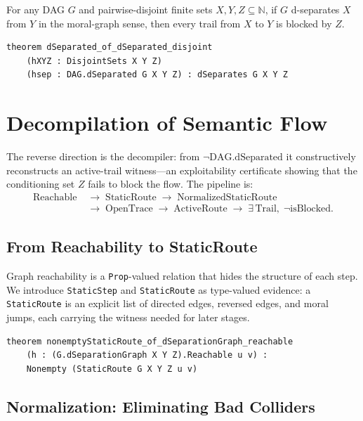 \documentclass[acmsmall,screen,nonacm]{acmart}
\newcommand{\lean}[1]{\lstinline!#1!}
\newcommand{\N}{\mathbb{N}}
\begin{document}
\begin{theorem}[Soundness]\label{thm:soundness}
For any DAG $G$ and pairwise-disjoint finite sets $X, Y, Z \subseteq \N$,
if $G$ d-separates $X$ from $Y$ in the moral-graph sense, then every trail
from $X$ to $Y$ is blocked by $Z$.
\end{theorem}

\begin{lstlisting}[caption={Top-level soundness theorem}]
theorem dSeparated_of_dSeparated_disjoint
    (hXYZ : DisjointSets X Y Z)
    (hsep : DAG.dSeparated G X Y Z) : dSeparates G X Y Z
\end{lstlisting}

\section{Decompilation of Semantic Flow}\label{sec:reverse}

The reverse direction is the decompiler: from $\neg\text{DAG.dSeparated}$ it
constructively reconstructs an active-trail witness---an exploitability
certificate showing that the conditioning set $Z$ fails to block the flow.
The pipeline is:
\[
\begin{aligned}
\text{Reachable}
&\;\to\; \text{StaticRoute}
\;\to\; \text{NormalizedStaticRoute} \\
&\;\to\; \text{OpenTrace}
\;\to\; \text{ActiveRoute}
\;\to\; \exists\,\text{Trail},\;\neg\text{isBlocked}.
\end{aligned}
\]

\subsection{From Reachability to StaticRoute}

Graph reachability is a \lean{Prop}-valued relation that hides the structure of
each step.  We introduce \lean{StaticStep} and \lean{StaticRoute} as type-valued
evidence: a \lean{StaticRoute} is an explicit list of directed edges, reversed
edges, and moral jumps, each carrying the witness needed for later stages.

\begin{lstlisting}[caption={Reachability to static route}]
theorem nonemptyStaticRoute_of_dSeparationGraph_reachable
    (h : (G.dSeparationGraph X Y Z).Reachable u v) :
    Nonempty (StaticRoute G X Y Z u v)
\end{lstlisting}

\subsection{Normalization: Eliminating Bad Colliders}
\end{document}
